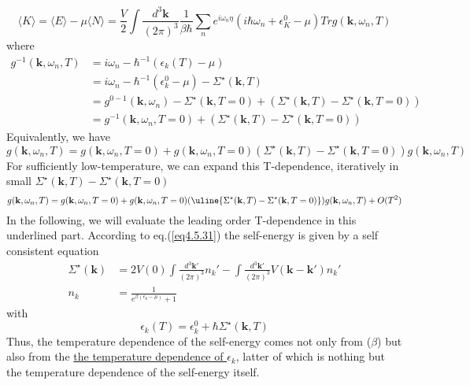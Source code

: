 \begin{equation}\tag{4.3.10}
\langle K \rangle=\langle E \rangle-\mu\langle N \rangle=\frac{V}{2} \int \frac{d^3 \mathbf{k}}{(2\pi)^3} \frac{1}{\beta\hbar} \sum_n e^{i\omega_n \eta}\left(i\hbar\omega_n+\epsilon_K^0-\mu\right)Tr g(\mathbf{k},\omega_n,T)
\end{equation}
where
\[
\begin{aligned}
g^{-1}(\mathbf{k},\omega_n,T)&=i\omega_n -\hbar^{-1} (\epsilon_k(T)-\mu)\\
&=i\omega_n -\hbar^{-1} (\epsilon_k^0-\mu) - \Sigma^\star(\mathbf{k},T)\\
&=g^{0-1}(\mathbf{k},\omega_n)-\Sigma^\star(\mathbf{k},T=0)+(\Sigma^\star(\mathbf{k},T)- \Sigma^\star(\mathbf{k},T=0))\\
&=g^{-1}(\mathbf{k},\omega_n,T=0)+(\Sigma^\star(\mathbf{k},T)-\Sigma^\star(\mathbf{k},T=0))
\end{aligned}
\]
Equivalently, we have
\begin{equation}
g(\mathbf{k},\omega_n,T)=g(\mathbf{k},\omega_n,T=0)+g(\mathbf{k},\omega_n,T=0) (\Sigma^\star(\mathbf{k},T)-\Sigma^\star(\mathbf{k},T=0)) g(\mathbf{k},\omega_n,T)
\end{equation}
For sufficiently low-temperature, we can expand this T-dependence, iteratively in small $\Sigma^\star(\mathbf{k},T)-\Sigma^\star(\mathbf{k},T=0)$
\begin{equation}\label{eq4.6.15}
g(\mathbf{k},\omega_n,T)=g(\mathbf{k},\omega_n,T=0)+g(\mathbf{k},\omega_n,T=0) (\uline{\Sigma^\star(\mathbf{k},T)-\Sigma^\star(\mathbf{k},T=0)}) g(\mathbf{k},\omega_n,T)+O(T^2)
\end{equation}
In the following, we will evaluate the leading order T-dependence in this underlined part.
According to eq.(\ref{eq4.5.31}) the self-energy is given by a self consistent equation
\begin{equation}\label{eq4.6.16}
\begin{aligned}
\Sigma^\star(\mathbf{k})&=2V(0)\int\frac{d^3\mathbf{k}'}{(2\pi)^3}n_k'-\int\frac{d^3\mathbf{k}'}{(2\pi)^3}V(\mathbf{k}-\mathbf{k}')n_k'\\
n_k&=\frac{1}{e^{\beta(\epsilon_k-\mu)}+1}
\end{aligned}
\end{equation}
with
\begin{equation}
\epsilon_k(T)=\epsilon_k^0+\hbar \Sigma^\star (\mathbf{k},T)
\end{equation}
Thus, the temperature dependence of the self-energy comes not only from ($\beta$) but also from the \uline{the temperature dependence of $\epsilon_k$}, latter of which is nothing but the temperature dependence of the self-energy itself.

